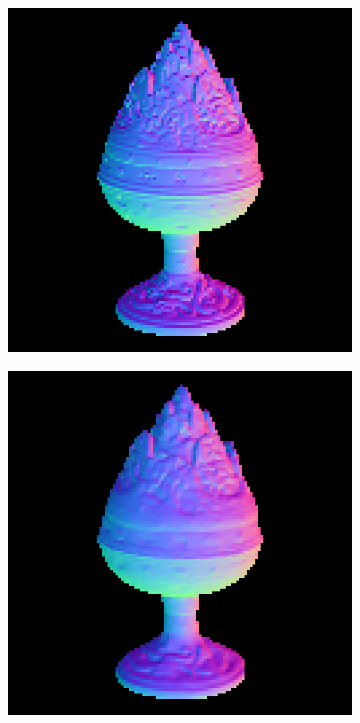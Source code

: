 \begin{figure}
\begin{subfigure}[b]{0.24\linewidth}
		\includegraphics[width=\linewidth]{./Figures/gcnn_synthetic/fancy_eval_2_groundtruth.png}
	\end{subfigure}
	\begin{subfigure}[b]{0.24\linewidth}
		\includegraphics[width=\linewidth]{./Figures/gcnn_synthetic/fancy_eval_2_normal_an2-8-1000.png}

\end{subfigure}
\end{figure}
